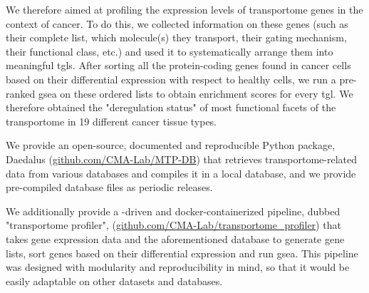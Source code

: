 We therefore aimed at profiling the expression levels of transportome genes in the context of cancer.
To do this, we collected information on these genes (such as their complete list, which molecule(s) they transport, their gating mechanism, their functional class, etc.) and used it to systematically arrange them into meaningful \glspl{tgl}.
After sorting all the protein-coding genes found in cancer cells based on their differential expression with respect to healthy cells, we run a pre-ranked \gls{gsea} on these ordered lists to obtain enrichment scores for every \gls{tgl}.
We therefore obtained the "deregulation status" of most functional facets of the transportome in 19 different cancer tissue types.

We provide an open-source, documented and reproducible Python package, Daedalus (\href{https://github.com/CMA-Lab/MTP-DB}{github.com/CMA-Lab/MTP-DB}) that retrieves transportome-related data from various databases and compiles it in a local  database, and we provide pre-compiled database files as periodic releases.

We additionally provide a -driven and docker-containerized pipeline, dubbed "transportome profiler", (\href{https://github.com/CMA-Lab/transportome_profiler}{github.com/CMA-Lab/transportome\_profiler}) that takes gene expression data and the aforementioned database to generate gene lists, sort genes based on their differential expression and run \gls{gsea}.
This pipeline was designed with modularity and reproducibility in mind, so that it would be easily adaptable on other datasets and databases.
